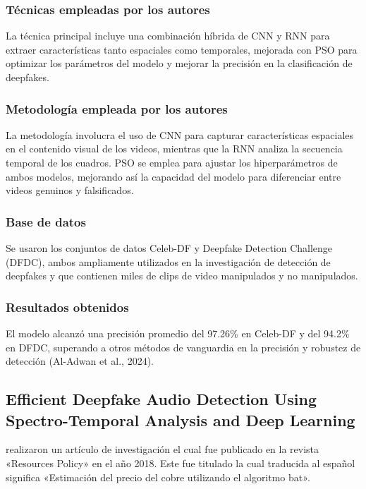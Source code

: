 \subsubsection{Técnicas empleadas por los autores}
La técnica principal incluye una combinación híbrida de CNN y RNN para extraer características tanto espaciales como temporales, mejorada con PSO para optimizar los parámetros del modelo y mejorar la precisión en la clasificación de deepfakes.

\subsubsection{Metodología empleada por los autores}
La metodología involucra el uso de CNN para capturar características espaciales en el contenido visual de los videos, mientras que la RNN analiza la secuencia temporal de los cuadros. PSO se emplea para ajustar los hiperparámetros de ambos modelos, mejorando así la capacidad del modelo para diferenciar entre videos genuinos y falsificados.

\subsubsection{Base de datos}
Se usaron los conjuntos de datos Celeb-DF y Deepfake Detection Challenge (DFDC), ambos ampliamente utilizados en la investigación de detección de deepfakes y que contienen miles de clips de video manipulados y no manipulados.

\subsubsection{Resultados obtenidos}
El modelo alcanzó una precisión promedio del 97.26\% en Celeb-DF y del 94.2\% en DFDC, superando a otros métodos de vanguardia en la precisión y robustez de detección (Al-Adwan et al., 2024).

\subsection{Efficient Deepfake Audio Detection Using Spectro-Temporal Analysis and Deep Learning \citep*{pr_dehghani2018copper}}
\citeauthor{pr_dehghani2018copper} realizaron un artículo de investigación el cual fue publicado en la revista «Resources Policy» en el año 2018. Este fue titulado  la cual traducida al español significa «Estimación del precio del cobre utilizando el algoritmo bat».

